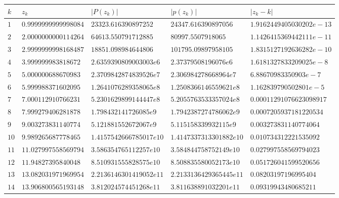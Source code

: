 \documentclass[12pt]{article}
\begin{document}
        \begin{table}[h!]
            \begin{adjustwidth}{-1cm}{}
            \begin{tabularx}{1.1\textwidth}{l l l l l }
                \hline
                $k$ & $z_k$ & $|P(z_k)|$ & $|p(z_k)|$ & $|z_k - k|$ \\
                \hline
                $1$ & $0.9999999999998084$ & $23323.616390897252$ & $24347.616390897056$ & $1.9162449405030202e-13$ \\
                $2$ & $2.0000000000114264$ & $64613.550791712885$ & $80997.5507918065$ & $1.1426415369442111e-11$ \\
                $3$ & $2.9999999998168487$ & $18851.098984644806$ & $101795.09897958105$ & $1.8315127192636282e-10$ \\
                $4$ & $3.999999983818672$ & $2.6359390809003003e6$ & $2.37379508196076e6$ & $1.6181327833209025e-8$ \\
                $5$ & $5.000000688670983$ & $2.3709842874839526e7$ & $2.306984278668964e7$ & $6.88670983350903e-7$ \\
                $6$ & $5.999988371602095$ & $1.2641076289358065e8$ & $1.2508366146559621e8$ & $1.162839790502801e-5$ \\
                $7$ & $7.000112910766231$ & $5.2301629899144447e8$ & $5.2055763533357024e8$ & $0.00011291076623098917$ \\
                $8$ & $7.999279406281878$ & $1.798432141726085e9$ & $1.7942387274786062e9$ & $0.0007205937181220534$ \\
                $9$ & $9.003273831140774$ & $5.121881552672067e9$ & $5.115158339932115e9$ & $0.003273831140774064$ \\
                $10$ & $9.989265687778465$ & $1.4157542666785017e10$ & $1.4147337313301882e10$ & $0.010734312221535092$ \\
                $11$ & $11.027997558569794$ & $3.586354765112257e10$ & $3.584844758752149e10$ & $0.027997558569794023$ \\
                $12$ & $11.94827395840048$ & $8.510931555828575e10$ & $8.508835580052173e10$ & $0.051726041599520656$ \\
                $13$ & $13.082031971969954$ & $2.2136146301419052e11$ & $2.2133136429365445e11$ & $0.08203197196995404$ \\
                $14$ & $13.906800565193148$ & $3.812024574451268e11$ & $3.811638891032201e11$ & $0.09319943480685211$ \\

\end{tabularx}
\end{adjustwidth}
\end{table}
\end{document}
